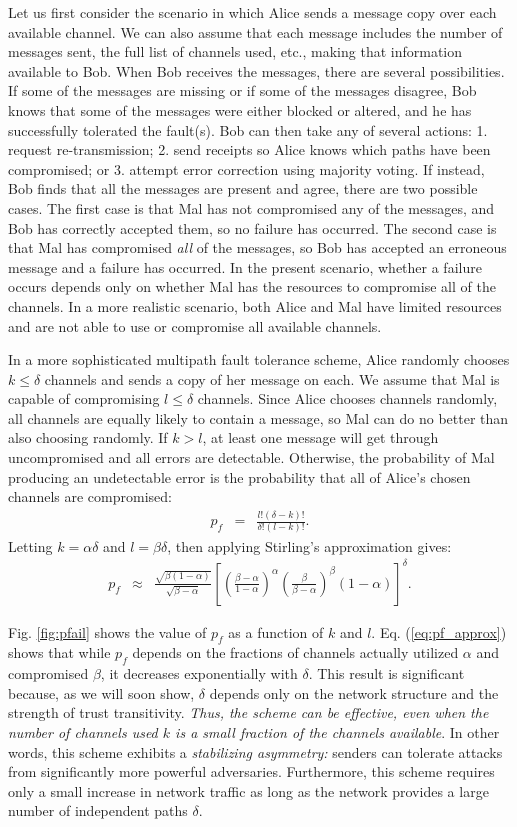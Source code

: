 \documentclass[10pt,letterpaper]{article}
\newcommand{\beq}{\begin{eqnarray}}
\newcommand{\eeq}{\end{eqnarray}}
\begin{document}
Let us first consider the scenario in which
Alice sends a message copy over each available channel.
We can also assume that each message includes the number of messages sent,
the full list of channels used, etc.,
making that information available to Bob.
When Bob receives the messages, there are several possibilities.
If some of the messages are missing
or if some of the messages disagree,
Bob knows that some of the messages were either blocked or altered,
and he has successfully tolerated the fault(s).
Bob can then take any of several actions:
1. request re-transmission;
2. send receipts so Alice knows which paths have been compromised;
or 3. attempt error correction using majority voting.
If instead, Bob finds that all the messages are present and agree,
there are two possible cases.
The first case is that Mal has not compromised any of the messages,
and Bob has correctly accepted them, so no failure has occurred.
The second case is that Mal has compromised {\em all} of the messages,
so Bob has accepted an erroneous message and a failure has occurred.
In the present scenario,
whether a failure occurs depends only on whether Mal has the resources to
compromise all of the channels.
In a more realistic scenario,
both Alice and Mal have limited resources and are not able to use or
compromise all available channels.

In a more sophisticated multipath fault tolerance scheme,
Alice randomly chooses $k \leq \delta$ channels and sends a copy of
her message on each.
We assume that Mal is capable of compromising $l \leq \delta$ channels.
Since Alice chooses channels randomly,
all channels are equally likely to contain a message,
so Mal can do no better than also choosing randomly.
If $k > l$, at least one message will get through uncompromised and all
errors are detectable.
Otherwise, the probability of Mal producing an undetectable error is
the probability that all of Alice's chosen channels are compromised:
\beq
\label{eq:pf}
p_f &=& \frac{l!(\delta-k)!}{\delta!(l-k)!}.
\eeq
Letting $k=\alpha \delta$ and $l=\beta \delta$, then applying Stirling's
approximation gives:
\begin{eqnarray}
\label{eq:pf_approx}
p_f &\approx&
\frac{\sqrt{\beta(1-\alpha)}}{\sqrt{\beta-\alpha}}
\left[
    \left( \frac{\beta-\alpha}{1-\alpha} \right)^{\alpha}
    \left( \frac{\beta}{\beta-\alpha} \right)^{\beta}
    (1-\alpha)
\right]^{\delta}.
\end{eqnarray}

Fig. \ref{fig:pfail} shows the value of $p_f$
as a function of $k$ and $l$.
Eq. (\ref{eq:pf_approx}) shows that while $p_f$
depends on the fractions of
channels actually utilized $\alpha$ and compromised $\beta$,
it decreases exponentially with $\delta$.
This result is significant because,
as we will soon show, $\delta$
depends only on the network structure
and the strength of trust transitivity.
{\em Thus, the scheme can be effective, even when the number of channels used
$k$ is a small fraction of the channels available}.
In other words, this scheme exhibits a {\em stabilizing asymmetry:}
senders can tolerate attacks from significantly more powerful
adversaries.
Furthermore, this scheme requires only a small increase in network traffic
as long as the network provides a large number of independent paths $\delta$.
\end{document}
